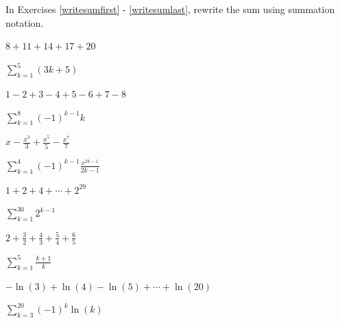 \documentclass{ximera}
\begin{document}
\begin{question}
    
In Exercises \ref{writesumfirst} - \ref{writesumlast},  rewrite the sum using summation notation.

\begin{problem}\label{writesumfirst}
$8 + 11 + 14 + 17 + 20$   

\begin{solution}
    $\displaystyle \sum_{k = 1}^{5} (3k + 5)$
\end{solution}
\end{problem}   

\begin{problem}
$1 - 2 + 3 - 4 + 5 - 6 + 7 - 8$  

\begin{solution}
    $\displaystyle \sum_{k = 1}^{8} (-1)^{k - 1}k$
\end{solution}

\end{problem} 

\begin{problem}
$x - \frac{x^{3}}{3} + \frac{x^{5}}{5} - \frac{x^{7}}{7}$

\begin{solution}
    $\displaystyle \sum_{k = 1}^{4} (-1)^{k - 1} \frac{x^{2k - 1}}{2k - 1}$
\end{solution}

\end{problem}

\begin{problem}
$1 + 2 + 4 + \cdots + 2^{29}$

\begin{solution}
    $\displaystyle \sum_{k = 1}^{30} 2^{k-1}$
\end{solution}

\end{problem} 

\begin{problem}
$2 + \frac{3}{2} + \frac{4}{3} + \frac{5}{4} + \frac{6}{5}$

\begin{solution}
    $\displaystyle \sum_{k = 1}^{5} \frac{k + 1}{k}$
\end{solution}

\end{problem}

\begin{problem}
$-\ln(3) + \ln(4) - \ln(5) + \cdots + \ln(20)$

\begin{solution}
    $\displaystyle \sum_{k = 3}^{20} (-1)^{k} \ln(k)$
\end{solution}


\end{problem}
\end{question}
\end{document}
